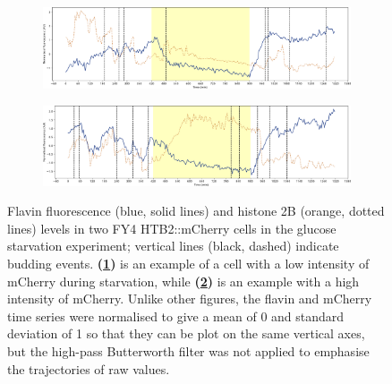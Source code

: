 \begin{figure}
  \centering
  \begin{subfigure}[htpb]{1.0\textwidth}
   \centering
   \includegraphics[width=\textwidth]{starvation_raw_13-39-01.pdf}
   \caption{
   }
   \label{fig:biology-starvation-raw-2}
  \end{subfigure}

  \begin{subfigure}[htpb]{1.0\textwidth}
   \centering
   \includegraphics[width=\textwidth]{starvation_raw_13-07-02.pdf}
   \caption{
   }
   \label{fig:biology-starvation-raw-1}
  \end{subfigure}

  \caption{
    Flavin fluorescence (blue, solid lines) and histone 2B (orange, dotted lines) levels in two FY4 HTB2::mCherry cells in the glucose starvation experiment; vertical lines (black, dashed) indicate budding events.
    \textbf{(\ref{fig:biology-starvation-raw-2})} is an example of a cell with a low intensity of mCherry during starvation, while \textbf{(\ref{fig:biology-starvation-raw-1})} is an example with a high intensity of mCherry.
    Unlike other figures, the flavin and mCherry time series were normalised to give a mean of 0 and standard deviation of 1 so that they can be plot on the same vertical axes, but the high-pass Butterworth filter was not applied to emphasise the trajectories of raw values.
  }
  \label{fig:biology-starvation-raw}
\end{figure}


